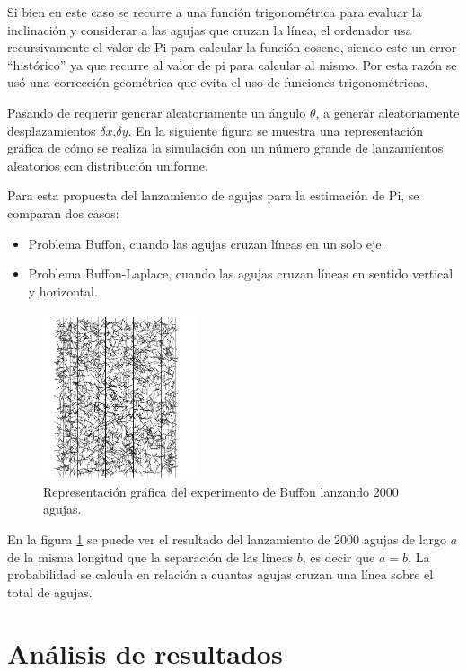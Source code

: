 \documentclass{rbf}
\begin{document}
Si bien en este caso se recurre a una función trigonométrica para evaluar la inclinación y considerar a las agujas que cruzan la línea, el ordenador usa recursivamente el valor de Pi para calcular la función coseno, siendo este un error “histórico” ya que recurre al valor de pi para calcular al mismo. Por esta razón se usó una corrección geométrica que evita el uso de funciones trigonométricas.

Pasando de requerir generar aleatoriamente un ángulo $\theta$, a generar aleatoriamente desplazamientos $\delta x$,$\delta y$. En la siguiente figura se muestra una representación gráfica de cómo se realiza la simulación con un número grande de lanzamientos aleatorios con distribución uniforme. \cite{Statistics}

Para esta propuesta del lanzamiento de agujas para la estimación de Pi, se comparan dos casos:
\begin{itemize}
    \item Problema Buffon, cuando las agujas cruzan líneas en un solo eje.
    \item Problema Buffon-Laplace, cuando las agujas cruzan líneas en sentido vertical y horizontal.
\end{itemize}

\begin{figure}[tbp!]
 \centering
  \includegraphics[width=0.4\textwidth]{figures/buffon.jpg}
	\caption{Representación gráfica del experimento de Buffon lanzando 2000 agujas.\cite{Statistics}}
 \label{buff}
\end{figure}


En la figura \ref{buff} se puede ver el resultado del lanzamiento de 2000 agujas de largo $a$ de la misma longitud que la separación de las lineas $b$, es decir que $a=b$. La probabilidad se calcula en relación a cuantas agujas cruzan una línea sobre el total de agujas. 


\section{Análisis de resultados}
\end{document}
